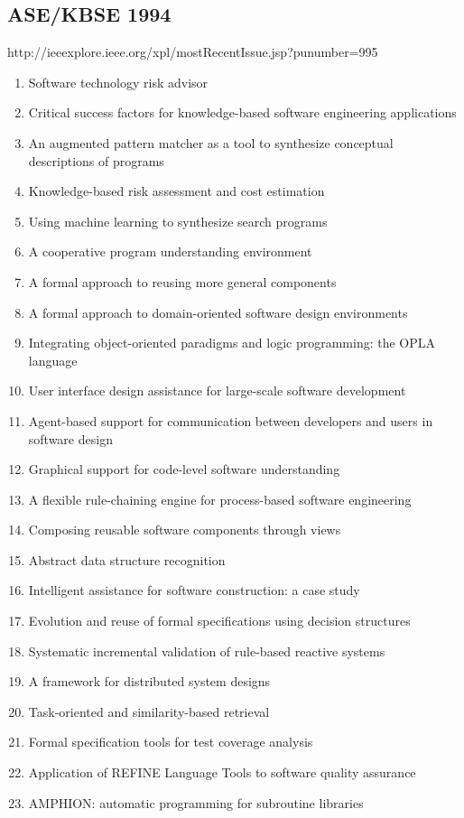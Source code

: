 \subsection{ASE/KBSE 1994}

http://ieeexplore.ieee.org/xpl/mostRecentIssue.jsp?punumber=995

\begin{enumerate}[itemsep=-1ex]
  \item Software technology risk advisor
  \item Critical success factors for knowledge-based software engineering applications
  \item An augmented pattern matcher as a tool to synthesize conceptual descriptions of programs
  \item Knowledge-based risk assessment and cost estimation
  \item Using machine learning to synthesize search programs
  \item A cooperative program understanding environment
  \item A formal approach to reusing more general components
  \item A formal approach to domain-oriented software design environments
  \item Integrating object-oriented paradigms and logic programming: the OPLA language
  \item User interface design assistance for large-scale software development
  \item Agent-based support for communication between developers and users in software design
  \item Graphical support for code-level software understanding
  \item A flexible rule-chaining engine for process-based software engineering
  \item Composing reusable software components through views
  \item Abstract data structure recognition
  \item Intelligent assistance for software construction: a case study
  \item Evolution and reuse of formal specifications using decision structures
  \item Systematic incremental validation of rule-based reactive systems
  \item A framework for distributed system designs
  \item Task-oriented and similarity-based retrieval
  \item Formal specification tools for test coverage analysis
  \item Application of REFINE Language Tools to software quality assurance
  \item AMPHION: automatic programming for subroutine libraries 
\end{enumerate}

